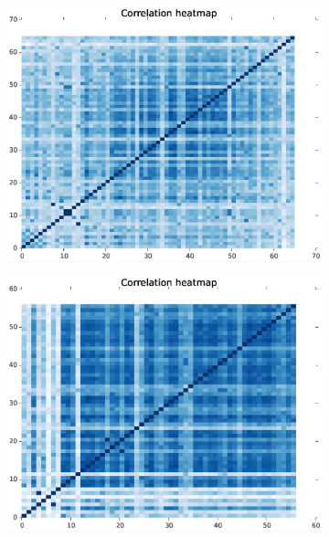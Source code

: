 \documentclass[11pt]{article}
\begin{document}
\begin{figure}
    \centering
    \begin{subfigure}{.48\textwidth}
        \centering
        \includegraphics[width=\linewidth]{plots/tuningCorr_desc_civar}
    \end{subfigure}
    \begin{subfigure}{.48\textwidth}
        \centering
        \includegraphics[width=\linewidth]{plots/tuningCorr_desc_civar_m2}
    \end{subfigure}
    \newline
    \begin{subfigure}{.48\textwidth}

\end{subfigure}
\end{figure}
\end{document}
